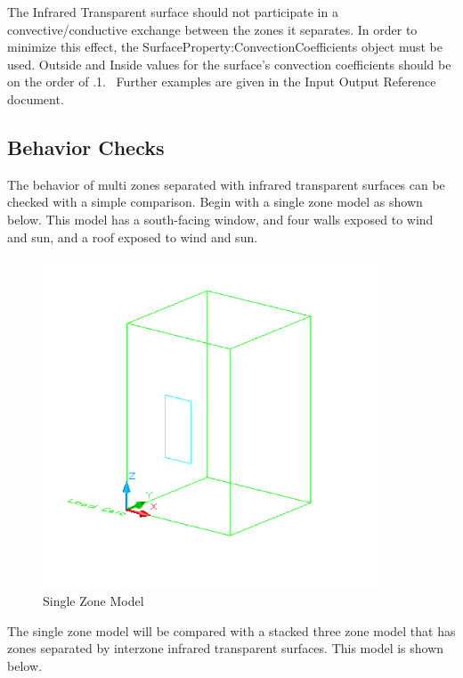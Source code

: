 The Infrared Transparent surface should not participate in a convective/conductive exchange between the zones it separates. In order to minimize this effect, the SurfaceProperty:ConvectionCoefficients object must be used. Outside and Inside values for the surface's convection coefficients should be on the order of .1.~ Further examples are given in the Input Output Reference document.

\subsection{Behavior Checks}\label{behavior-checks}

The behavior of multi zones separated with infrared transparent surfaces can be checked with a simple comparison. Begin with a single zone model as shown below. This model has a south-facing window, and four walls exposed to wind and sun, and a roof exposed to wind and sun.

\begin{figure}[hbtp] %
\centering
\includegraphics[width=0.9\textwidth, height=0.9\textheight, keepaspectratio=true]{media/image396.png}
\caption{Single Zone Model \protect \label{fig:single-zone-model}}
\end{figure}

The single zone model will be compared with a stacked three zone model that has zones separated by interzone infrared transparent surfaces. This model is shown below.

